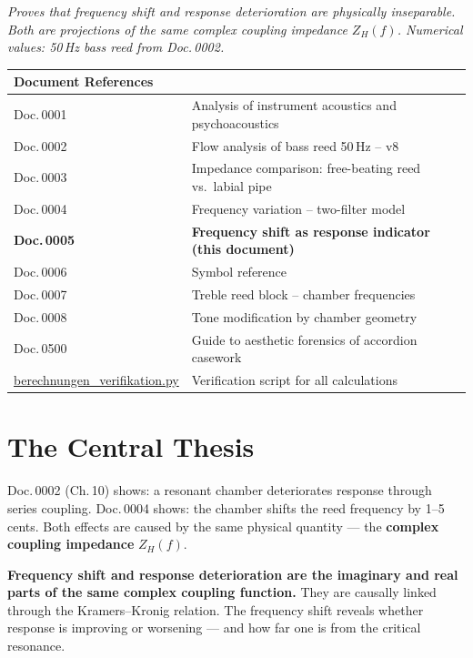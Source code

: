 \documentclass[11pt,a4paper]{article}
\begin{document}
\hbmaketitle

{\small\itshape Proves that frequency shift and response deterioration are physically inseparable. Both are projections of the same complex coupling impedance $Z_H(f)$. Numerical values: 50\,Hz bass reed from Doc.\,0002.}

\vspace{2mm}
\begin{center}\small
\begin{tabularx}{\textwidth}{l X}
\hbtoprule
\textbf{Document References} \\
\midrule
Doc.\,0001 & Analysis of instrument acoustics and psychoacoustics \\
Doc.\,0002 & Flow analysis of bass reed 50\,Hz -- v8 \\
Doc.\,0003 & Impedance comparison: free-beating reed vs.\ labial pipe \\
Doc.\,0004 & Frequency variation -- two-filter model \\
\textbf{Doc.\,0005} & \textbf{Frequency shift as response indicator (this document)} \\
Doc.\,0006 & Symbol reference \\
Doc.\,0007 & Treble reed block -- chamber frequencies \\
Doc.\,0008 & Tone modification by chamber geometry \\
Doc.\,0500 & Guide to aesthetic forensics of accordion casework \\
\midrule
\href{berechnungen_verifikation.py}{berechnungen\_verifikation.py} & Verification script for all calculations \\
\bottomrule
\end{tabularx}
\end{center}
\vspace{4mm}

\section{The Central Thesis}

Doc.\,0002 (Ch.\,10) shows: a resonant chamber deteriorates response through series coupling. Doc.\,0004 shows: the chamber shifts the reed frequency by 1--5\,cents. Both effects are caused by the same physical quantity --- the \textbf{complex coupling impedance} $Z_H(f)$.

\begin{keybox}
\textbf{Frequency shift and response deterioration are the imaginary and real parts of the same complex coupling function.} They are causally linked through the Kramers--Kronig relation. The frequency shift reveals whether response is improving or worsening --- and how far one is from the critical resonance.
\end{keybox}
\end{document}
